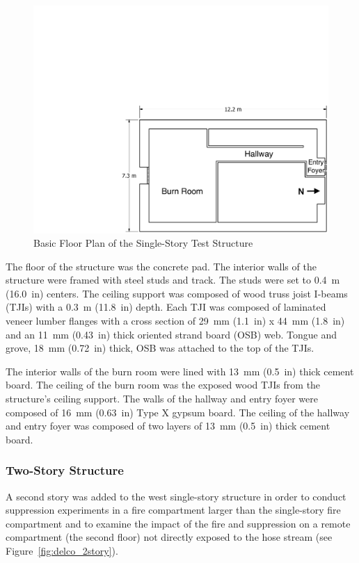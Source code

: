 \documentclass[12pt,oneside]{book}
\begin{document}
\begin{figure}[!ht]
	\includegraphics[width=\columnwidth]{../Figures/Floor_Plans/PDFs/East_Structure/DelCo_2012_East_Structure_Plain}
	\caption{Basic Floor Plan of the Single-Story Test Structure}
	\label{fig:Test_Structure_Floor_Plan}
\end{figure}

The floor of the structure was the concrete pad. The interior walls of the structure were framed with steel studs and track. The studs were set to 0.4~m (16.0~in) centers. The ceiling support was composed of wood truss joist I-beams (TJIs) with a 0.3~m (11.8~in) depth. Each TJI was composed of laminated veneer lumber flanges with a cross section of 29~mm (1.1~in) x 44~mm (1.8~in) and an 11~mm (0.43~in) thick oriented strand board (OSB) web. Tongue and grove, 18~mm (0.72~in) thick, OSB was attached to the top of the TJIs.

The interior walls of the burn room were lined with 13~mm (0.5~in) thick cement board. The ceiling of the burn room was the exposed wood TJIs from the structure's ceiling support. The walls of the hallway and entry foyer were composed of 16~mm (0.63~in) Type X gypsum board. The ceiling of the hallway and entry foyer was composed of two layers of 13~mm (0.5~in) thick cement board.

\subsubsection*{Two-Story Structure}

A second story was added to the west single-story structure in order to conduct suppression experiments in a fire compartment larger than the single-story fire compartment and to examine the impact of the fire and suppression on a remote compartment (the second floor) not directly exposed to the hose stream (see Figure~\ref{fig:delco_2story}).
\end{document}
